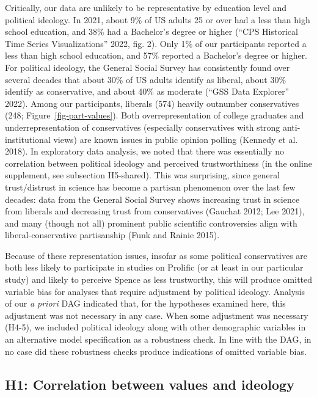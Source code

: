 \documentclass[
  letterpaper,
  DIV=11,
  numbers=noendperiod]{scrartcl}
\begin{document}
Critically, our data are unlikely to be representative by education
level and political ideology. In 2021, about 9\% of US adults 25 or over
had a less than high school education, and 38\% had a Bachelor's degree
or higher ({``CPS Historical Time Series Visualizations''} 2022, fig.
2). Only 1\% of our participants reported a less than high school
education, and 57\% reported a Bachelor's degree or higher. For
political ideology, the General Social Survey has consistently found
over several decades that about 30\% of US adults identify as liberal,
about 30\% identify as conservative, and about 40\% as moderate ({``GSS
Data Explorer''} 2022). Among our participants, liberals (574) heavily
outnumber conservatives (248; Figure~\ref{fig-part-values}). Both
overrepresentation of college graduates and underrepresentation of
conservatives (especially conservatives with strong anti-institutional
views) are known issues in public opinion polling (Kennedy et al. 2018).
In exploratory data analysis, we noted that there was essentially no
correlation between political ideology and perceived trustworthiness (in
the online supplement, see subsection H5-shared). This was surprising,
since general trust/distrust in science has become a partisan phenomenon
over the last few decades: data from the General Social Survey shows
increasing trust in science from liberals and decreasing trust from
conservatives (Gauchat 2012; Lee 2021), and many (though not all)
prominent public scientific controversies align with
liberal-conservative partisanship (Funk and Rainie 2015).

Because of these representation issues, insofar as some political
conservatives are both less likely to participate in studies on Prolific
(or at least in our particular study) and likely to perceive Spence as
less trustworthy, this will produce omitted variable bias for analyses
that require adjustment by political ideology. Analysis of our \emph{a
priori} DAG indicated that, for the hypotheses examined here, this
adjustment was not necessary in any case. When some adjustment was
necessary (H4-5), we included political ideology along with other
demographic variables in an alternative model specification as a
robustness check. In line with the DAG, in no case did these robustness
checks produce indications of omitted variable bias.

\hypertarget{h1-correlation-between-values-and-ideology}{%
\subsection{H1: Correlation between values and
ideology}\label{h1-correlation-between-values-and-ideology}}
\end{document}
